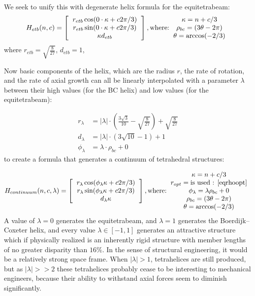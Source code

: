 \documentclass[11pt]{article}
\begin{document}
We seek to unify this with degenerate helix formula for the equitetrabeam:
\[
H_{etb}(n,c) =
\left [
  \begin{tabular}{c}
   $ r_{etb}  \cos( 0 \cdot \kappa  + c 2 \pi /3) $\\
   $ r_{etb}  \sin( 0 \cdot \kappa  + c 2 \pi /3) $\\
   $ \kappa d_{etb} $
  \end{tabular}
\right ],
\text{where:}
  \begin{tabular}{c}
 $\kappa = n + c/3$ \\
    $\rho_{bc} = (3 \theta - 2 \pi)$ \\
   $ \theta = \arccos(-2/3) $
  \end{tabular}      
\]
where $ r_{etb} = \sqrt{\frac{8}{27}}$, $d_{etb} = 1$,

Now basic components of the helix, which are the radius $r$, the rate of rotation, and the rate of
axial growth can all be linearly interpolated with a parameter $\lambda$ between their high values (for the BC helix)
and low values (for the equitetrabeam):

\begin{align*}
r_{\lambda}  &=  \lvert \lambda \rvert \cdot (\frac{3 \sqrt{3}}{10}  - \sqrt{\frac{8}{27}}) + \sqrt{\frac{8}{27}}  \\
d_{\lambda} &=   \lvert \lambda \rvert \cdot (3 \sqrt{10} - 1) + 1 \\
\phi_{\lambda} &=  \lambda \cdot \rho_{bc}  + 0
\end{align*}
to create a formula that generates a continuum of tetrahedral structures:

\[
H_{continuum}(n,c,\lambda) =
\left [
  \begin{tabular}{c}
   $ r_{\lambda} \cos(\phi_{\lambda} \kappa + c 2 \pi /3) $\\
   $ r_{\lambda}  \sin(\phi_{\lambda} \kappa + c 2 \pi /3) $\\
   $ d_{\lambda} \kappa $
  \end{tabular}
  \right ],
\text{where:}
  \begin{tabular}{c}
    $\kappa = n + c/3$ \\
    $ r_{opt} =  \text{is used : \eqref{eqrhoopt}} $ \\    
    $ \phi_{\lambda} =  \lambda \rho_{bc}  + 0 $\\
    $\rho_{bc} = (3 \theta - 2 \pi)$ \\
   $ \theta = \arccos(-2/3) $
  \end{tabular}      
\]
A value of $\lambda = 0$ generates the equitetrabeam, and $\lambda = 1$ generates the Boerdijk--Coxeter helix, and every
value $\lambda \in [-1,1]$ generates an attractive structure which if physically realized is an inherently rigid structure
with member lengths of no greater disparity than $16\%$.
In the sense of structural engineering, it would be a relatively strong space frame. When $\lvert \lambda \rvert > 1$, tetrahelices
are still produced, but as $\lvert \lambda \rvert >> 2$ these tetrahelices probably cease to be interesting to mechanical engineers,
because their ability to withstand axial forces seem to diminish significantly.
\end{document}

